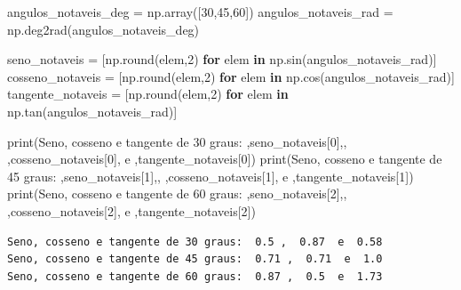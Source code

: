 \documentclass[
  brazilian,
  letterpaper,
  DIV=11,
  numbers=noendperiod]{scrreprt}
\newenvironment{Shaded}{\begin{snugshade}}{\end{snugshade}}
\newcommand{\BuiltInTok}[1]{\textcolor[rgb]{0.00,0.23,0.31}{#1}}
\newcommand{\ControlFlowTok}[1]{\textcolor[rgb]{0.00,0.23,0.31}{\textbf{#1}}}
\newcommand{\DecValTok}[1]{\textcolor[rgb]{0.68,0.00,0.00}{#1}}
\newcommand{\KeywordTok}[1]{\textcolor[rgb]{0.00,0.23,0.31}{\textbf{#1}}}
\newcommand{\NormalTok}[1]{\textcolor[rgb]{0.00,0.23,0.31}{#1}}
\newcommand{\OperatorTok}[1]{\textcolor[rgb]{0.37,0.37,0.37}{#1}}
\newcommand{\StringTok}[1]{\textcolor[rgb]{0.13,0.47,0.30}{#1}}
\begin{document}
\begin{Shaded}
\begin{Highlighting}[]
\NormalTok{angulos\_notaveis\_deg }\OperatorTok{=}\NormalTok{ np.array([}\DecValTok{30}\NormalTok{,}\DecValTok{45}\NormalTok{,}\DecValTok{60}\NormalTok{])}
\NormalTok{angulos\_notaveis\_rad }\OperatorTok{=}\NormalTok{ np.deg2rad(angulos\_notaveis\_deg)}

\NormalTok{seno\_notaveis }\OperatorTok{=}\NormalTok{ [np.}\BuiltInTok{round}\NormalTok{(elem,}\DecValTok{2}\NormalTok{) }\ControlFlowTok{for}\NormalTok{ elem }\KeywordTok{in}\NormalTok{ np.sin(angulos\_notaveis\_rad)]}
\NormalTok{cosseno\_notaveis }\OperatorTok{=}\NormalTok{ [np.}\BuiltInTok{round}\NormalTok{(elem,}\DecValTok{2}\NormalTok{) }\ControlFlowTok{for}\NormalTok{ elem }\KeywordTok{in}\NormalTok{ np.cos(angulos\_notaveis\_rad)]}
\NormalTok{tangente\_notaveis }\OperatorTok{=}\NormalTok{ [np.}\BuiltInTok{round}\NormalTok{(elem,}\DecValTok{2}\NormalTok{) }\ControlFlowTok{for}\NormalTok{ elem }\KeywordTok{in}\NormalTok{ np.tan(angulos\_notaveis\_rad)]}

\BuiltInTok{print}\NormalTok{(}\StringTok{\textquotesingle{}Seno, cosseno e tangente de 30 graus: \textquotesingle{}}\NormalTok{,seno\_notaveis[}\DecValTok{0}\NormalTok{],}\StringTok{\textquotesingle{}, \textquotesingle{}}\NormalTok{,cosseno\_notaveis[}\DecValTok{0}\NormalTok{],}\StringTok{\textquotesingle{} e \textquotesingle{}}\NormalTok{,tangente\_notaveis[}\DecValTok{0}\NormalTok{])}
\BuiltInTok{print}\NormalTok{(}\StringTok{\textquotesingle{}Seno, cosseno e tangente de 45 graus: \textquotesingle{}}\NormalTok{,seno\_notaveis[}\DecValTok{1}\NormalTok{],}\StringTok{\textquotesingle{}, \textquotesingle{}}\NormalTok{,cosseno\_notaveis[}\DecValTok{1}\NormalTok{],}\StringTok{\textquotesingle{} e \textquotesingle{}}\NormalTok{,tangente\_notaveis[}\DecValTok{1}\NormalTok{])}
\BuiltInTok{print}\NormalTok{(}\StringTok{\textquotesingle{}Seno, cosseno e tangente de 60 graus: \textquotesingle{}}\NormalTok{,seno\_notaveis[}\DecValTok{2}\NormalTok{],}\StringTok{\textquotesingle{}, \textquotesingle{}}\NormalTok{,cosseno\_notaveis[}\DecValTok{2}\NormalTok{],}\StringTok{\textquotesingle{} e \textquotesingle{}}\NormalTok{,tangente\_notaveis[}\DecValTok{2}\NormalTok{])}
\end{Highlighting}
\end{Shaded}

\begin{verbatim}
Seno, cosseno e tangente de 30 graus:  0.5 ,  0.87  e  0.58
Seno, cosseno e tangente de 45 graus:  0.71 ,  0.71  e  1.0
Seno, cosseno e tangente de 60 graus:  0.87 ,  0.5  e  1.73
\end{verbatim}
\end{document}
